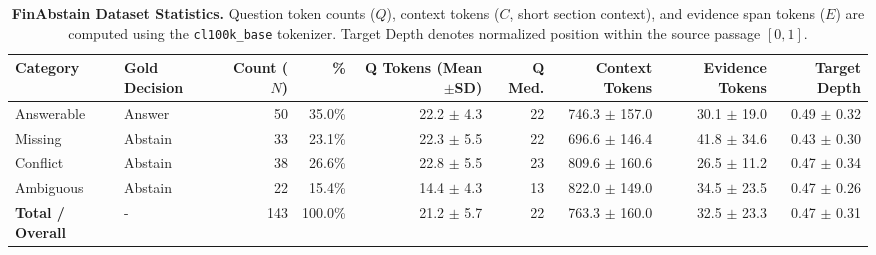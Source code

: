 \begin{table}[t]
\centering
\small
\caption{\textbf{FinAbstain Dataset Statistics.} Question token counts ($Q$), context tokens ($C$, short section context), and evidence span tokens ($E$) are computed using the \texttt{cl100k\_base} tokenizer. Target Depth denotes normalized position within the source passage $[0, 1]$.}
\label{tab:dataset_stats}
\begin{tabular}{llrrrrrrr}
\toprule
\textbf{Category} & \textbf{Gold Decision} & \textbf{Count ($N$)} & \textbf{\%} & \textbf{Q Tokens (Mean$\pm$SD)} & \textbf{Q Med.} & \textbf{Context Tokens} & \textbf{Evidence Tokens} & \textbf{Target Depth} \\
\midrule
Answerable & Answer & 50 & 35.0\% & 22.2 $\pm$ 4.3 & 22 & 746.3 $\pm$ 157.0 & 30.1 $\pm$ 19.0 & 0.49 $\pm$ 0.32 \\
Missing & Abstain & 33 & 23.1\% & 22.3 $\pm$ 5.5 & 22 & 696.6 $\pm$ 146.4 & 41.8 $\pm$ 34.6 & 0.43 $\pm$ 0.30 \\
Conflict & Abstain & 38 & 26.6\% & 22.8 $\pm$ 5.5 & 23 & 809.6 $\pm$ 160.6 & 26.5 $\pm$ 11.2 & 0.47 $\pm$ 0.34 \\
Ambiguous & Abstain & 22 & 15.4\% & 14.4 $\pm$ 4.3 & 13 & 822.0 $\pm$ 149.0 & 34.5 $\pm$ 23.5 & 0.47 $\pm$ 0.26 \\
\midrule
\textbf{Total / Overall} & - & 143 & 100.0\% & 21.2 $\pm$ 5.7 & 22 & 763.3 $\pm$ 160.0 & 32.5 $\pm$ 23.3 & 0.47 $\pm$ 0.31 \\
\bottomrule
\end{tabular}
\end{table}

